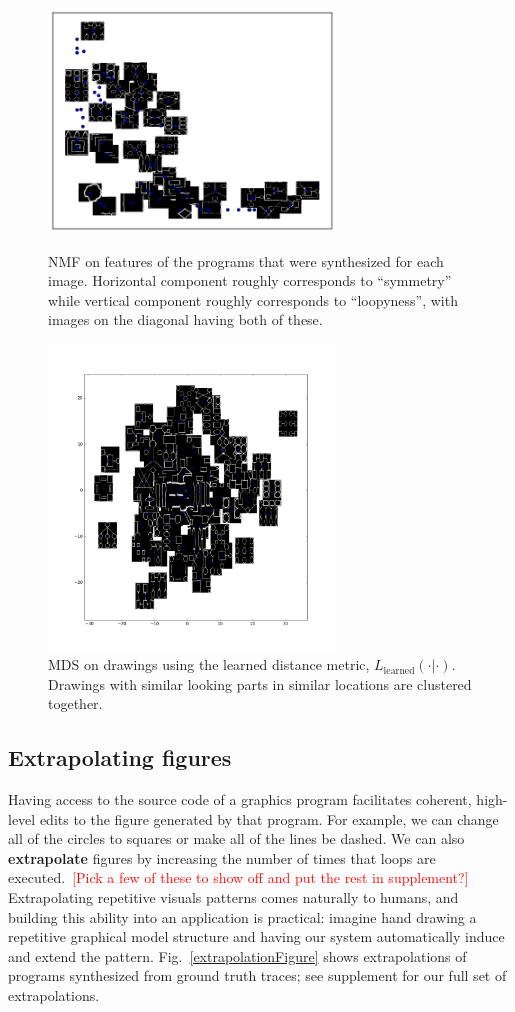 \documentclass{article}
\newcommand{\remark}[1]{\textcolor{red}{[#1]}}
\begin{document}
\begin{figure}
  \begin{minipage}{0.4\textwidth}
    \includegraphics[width = 3in]{figures/NMF.png}
    \caption{NMF on features of the programs that were synthesized for each image. Horizontal component roughly corresponds to ``symmetry'' while vertical component roughly corresponds to ``loopyness'', with images on the diagonal having both of these.}    \label{NMF}
  \end{minipage}\hfill
  \begin{minipage}{0.4\textwidth}
    \includegraphics[width = 3in]{figures/imageSimilarity.png} 
    \caption{MDS on drawings using the learned distance metric, $L_{\text{learned}}(\cdot|\cdot)$. Drawings with similar looking parts in similar locations are clustered together.}
  \end{minipage}
\end{figure}

\subsection{Extrapolating figures}
Having access to the source code of a graphics program facilitates coherent, high-level edits to the figure generated by that program. 
For example,
we can change all of the circles to squares or make all of the lines be dashed.
We can also \textbf{extrapolate} figures
by increasing the number of times that loops are executed.~\remark{Pick a few of these to show off and put the rest in supplement?}
Extrapolating repetitive visuals patterns comes naturally to humans,
and building this ability into an application is practical:
imagine hand drawing a repetitive graphical model structure
and having our system automatically induce and extend the pattern.
Fig.~\ref{extrapolationFigure} shows extrapolations of programs synthesized from ground truth traces;
see supplement for our full set of extrapolations.
\end{document}
